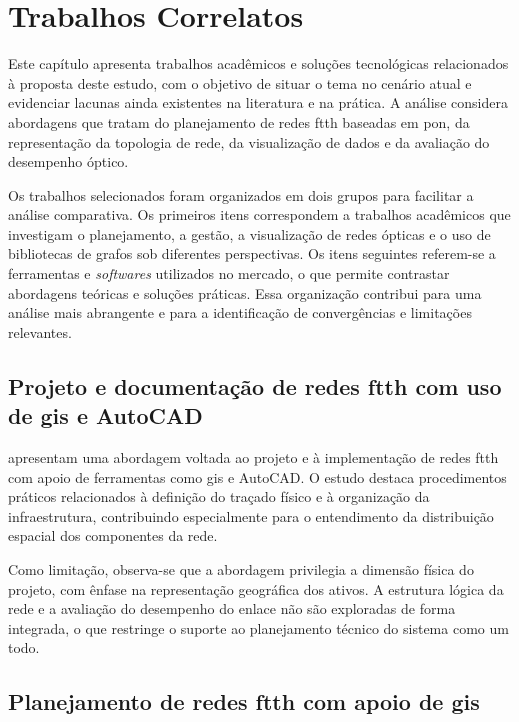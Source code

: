 
\chapter{Trabalhos Correlatos}

Este capítulo apresenta trabalhos acadêmicos e soluções tecnológicas relacionados à proposta deste estudo, com o objetivo de situar o tema no cenário atual e evidenciar lacunas ainda existentes na literatura e na prática. A análise considera abordagens que tratam do planejamento de redes \gls{ftth} baseadas em \gls{pon}, da representação da topologia de rede, da visualização de dados e da avaliação do desempenho óptico.

Os trabalhos selecionados foram organizados em dois grupos para facilitar a análise comparativa. Os primeiros itens correspondem a trabalhos acadêmicos que investigam o planejamento, a gestão, a visualização de redes ópticas e o uso de bibliotecas de grafos sob diferentes perspectivas. Os itens seguintes referem-se a ferramentas e \textit{softwares} utilizados no mercado, o que permite contrastar abordagens teóricas e soluções práticas. Essa organização contribui para uma análise mais abrangente e para a identificação de convergências e limitações relevantes.

\section{Projeto e documentação de redes \gls{ftth} com uso de \gls{gis} e AutoCAD \cite{irjet2017ftth_gis_autocad}}

 apresentam uma abordagem voltada ao projeto e à implementação de redes \gls{ftth} com apoio de ferramentas como \gls{gis} e AutoCAD. O estudo destaca procedimentos práticos relacionados à definição do traçado físico e à organização da infraestrutura, contribuindo especialmente para o entendimento da distribuição espacial dos componentes da rede. 

Como limitação, observa-se que a abordagem privilegia a dimensão física do projeto, com ênfase na representação geográfica dos ativos. A estrutura lógica da rede e a avaliação do desempenho do enlace não são exploradas de forma integrada, o que restringe o suporte ao planejamento técnico do sistema como um todo.


\section{Planejamento de redes \gls{ftth} com apoio de \gls{gis} \cite{rezgui2022qgis_ftth}}

